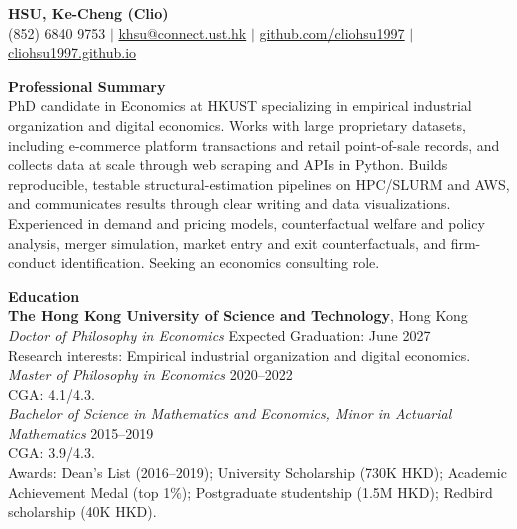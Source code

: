 \documentclass[11pt,letterpaper]{article}
\begin{document}
{\Large \textbf{HSU, Ke-Cheng (Clio)}}\\[1pt]
(852) 6840 9753 \quad $|$ \quad \href{mailto:khsu@connect.ust.hk}{khsu@connect.ust.hk} \quad $|$ \quad \href{https://github.com/cliohsu1997}{github.com/cliohsu1997} \quad $|$ \quad \href{https://cliohsu1997.github.io/}{cliohsu1997.github.io}

\vspace{16pt}

{\large \textbf{Professional Summary}}\\[-0.5pt]
PhD candidate in Economics at HKUST specializing in empirical industrial organization and digital economics. Works with large proprietary datasets, including e-commerce platform transactions and retail point-of-sale records, and collects data at scale through web scraping and APIs in Python. Builds reproducible, testable structural-estimation pipelines on HPC/SLURM and AWS, and communicates results through clear writing and data visualizations. Experienced in demand and pricing models, counterfactual welfare and policy analysis, merger simulation, market entry and exit counterfactuals, and firm-conduct identification. Seeking an economics consulting role.

\vspace{16pt}

{\large \textbf{Education}}\\[-0.5pt]
\textbf{The Hong Kong University of Science and Technology}, Hong Kong\\
\textit{Doctor of Philosophy in Economics} \hfill Expected Graduation: June 2027\\
Research interests: Empirical industrial organization and digital economics.\\
\textit{Master of Philosophy in Economics} \hfill 2020--2022\\
CGA: 4.1/4.3.\\
\textit{Bachelor of Science in Mathematics and Economics, Minor in Actuarial Mathematics} \hfill 2015--2019\\
CGA: 3.9/4.3.\\
Awards: Dean's List (2016--2019); University Scholarship (730K HKD); Academic Achievement Medal (top 1\%); Postgraduate studentship (1.5M HKD); Redbird scholarship (40K HKD).

\vspace{16pt}
\end{document}
